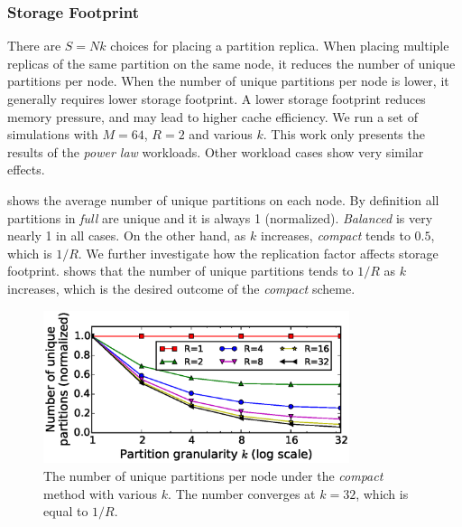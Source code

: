 \subsubsection{Storage Footprint}
There are $S=Nk$ choices for placing a partition replica.
When placing multiple replicas of the same partition on the same node,
it reduces the number of unique partitions per node.
When the number of unique partitions per node is lower,
it generally requires lower storage footprint.
A lower storage footprint reduces memory pressure, and may lead to higher cache efficiency.
We run a set of simulations with $M=64$, $R=2$ and various $k$.
This work only presents the results of the \emph{power law} workloads.
Other workload cases show very similar effects.

\myfigure{\ref{fig:simulation_colors}} shows the average number of
unique partitions on each node.
By definition all partitions in 
\emph{full} are unique and it is always 1 (normalized).
\emph{Balanced} is very nearly 1 in all cases.
On the other hand, as $k$ increases, 
\emph{compact} tends to $0.5$, which is $1/R$.
We further investigate how the replication factor affects storage footprint.
\myfigure{\ref{fig:simulation_colors_replication}} shows that the
number of unique partitions tends to $1/R$ as $k$ increases,
which is the desired outcome of the \emph{compact} scheme.


\begin{figure}[!htbp]
    \centering
    \includegraphics[width=0.8\textwidth]{figures/E42_simulation_colors_replication_resized_powerlaw.eps}
    \caption{The number of unique partitions per node under the \emph{compact} method with various $k$.  The number converges at $k=32$, which is equal to $1/R$.}
    \label{fig:simulation_colors_replication}
\end{figure}
